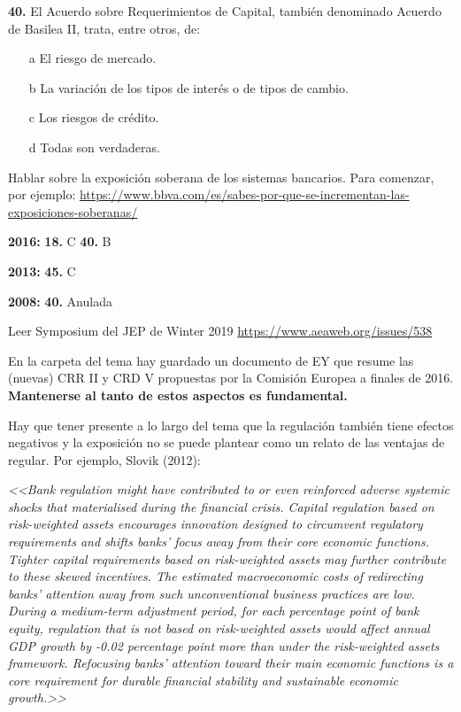 \documentclass{nuevotema}
\begin{document}

\textbf{40.} El Acuerdo sobre Requerimientos de Capital, también denominado Acuerdo de Basilea II, trata, entre otros, de:

\begin{itemize}
	\item[a] El riesgo de mercado.
	\item[b] La variación de los tipos de interés o de tipos de cambio.
	\item[c] Los riesgos de crédito.
	\item[d] Todas son verdaderas.
\end{itemize}

\notas

Hablar sobre la exposición soberana de los sistemas bancarios. Para comenzar, por ejemplo: \url{https://www.bbva.com/es/sabes-por-que-se-incrementan-las-exposiciones-soberanas/}

\textbf{2016:} \textbf{18.} C \textbf{40.} B

\textbf{2013:} \textbf{45.} C

\textbf{2008:} \textbf{40.} Anulada

Leer Symposium del JEP de Winter 2019 \url{https://www.aeaweb.org/issues/538}


En la carpeta del tema hay guardado un documento de EY que resume las (nuevas) CRR II y CRD V propuestas por la Comisión Europea a finales de 2016. \textbf{Mantenerse al tanto de estos aspectos es fundamental.}

Hay que tener presente a lo largo del tema que la regulación también tiene efectos negativos y la exposición no se puede plantear como un relato de las ventajas de regular. Por ejemplo, Slovik (2012):

\textit{<<Bank regulation might have contributed to or even reinforced adverse systemic shocks that materialised during the financial crisis. Capital regulation based on risk-weighted assets encourages innovation designed to circumvent regulatory requirements and shifts banks’ focus away from their core economic functions. Tighter capital requirements based on risk-weighted assets may further contribute to these skewed incentives. The estimated macroeconomic costs of redirecting banks’ attention away from such unconventional business practices are low. During a medium-term adjustment period, for each percentage point of bank equity, regulation that is not based on risk-weighted assets would affect annual GDP growth by -0.02 percentage point more than under the risk-weighted assets framework. Refocusing banks’ attention toward their main economic functions is a core requirement for durable financial stability and sustainable economic growth.>>}
\end{document}
